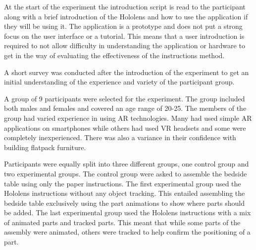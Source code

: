 \documentclass{l4proj}
\begin{document}
At the start of the experiment the introduction script is read to the participant along with a brief introduction of the Hololens and how to use the application if they will be using it. The application is a prototype and does not put a strong focus on the user interface or a tutorial. This means that a user introduction is required to not allow difficulty in understanding the application or hardware to get in the way of evaluating the effectiveness of the instructions method.

A short survey was conducted after the introduction of the experiment to get an initial understanding of the experience and variety of the participant group.

A group of 9 participants were selected for the experiment. The group included both males and females and covered an age range of 20-25. The members of the group had varied experience in using AR technologies. Many had used simple AR applications on smartphones while others had used VR headsets and some were completely inexperienced. There was also a variance in their confidence with building flatpack furniture. %

Participants were equally split into three different groups, one control group and two experimental groups. The control group were asked to assemble the bedside table using only the paper instructions. The first experimental group used the Hololens instructions without any object tracking. This entailed assembling the bedside table exclusively using the part animations to show where parts should be added. The last experimental group used the Hololens instructions with a mix of animated parts and tracked parts. This meant that while some parts of the assembly were animated, others were tracked to help confirm the positioning of a part.
\end{document}
